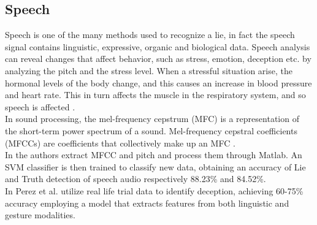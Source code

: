 \documentclass[LaM,binding=0.6cm,english,noexaminfo]{sapthesis}
\begin{document}
\subsection*{Speech}
Speech is one of the many methods used to recognize a lie, in fact the speech signal contains linguistic, expressive, organic and biological data. Speech analysis can reveal changes that affect behavior, such as stress, emotion, deception etc. by analyzing the pitch and the stress level. When a stressful situation arise, the hormonal levels of the body change, and this causes an increase in blood pressure and heart rate. This in turn affects the muscle in the respiratory system, and so speech is affected \cite{norena}. \\
 In sound processing, the mel-frequency cepstrum (MFC) is a representation of the short-term power spectrum of a sound. Mel-frequency cepstral coefficients (MFCCs) are coefficients that collectively make up an MFC \cite{wiki:mfcc}. \\
 In \cite{relidss} the authors extract MFCC and pitch and process them through Matlab. An SVM classifier is then trained to classify new data, obtaining an accuracy of Lie and Truth detection of speech audio respectively 88.23\% and 84.52\%. \\
In \cite{Perez-Rosas:2015:DDU:2818346.2820758} \cite{Mihalcea:2013:ADD:2522848.2522888} Perez et al. utilize real life trial data to identify deception, achieving 60-75\% accuracy employing a model that extracts features from both linguistic and gesture modalities.
 
\end{document}
